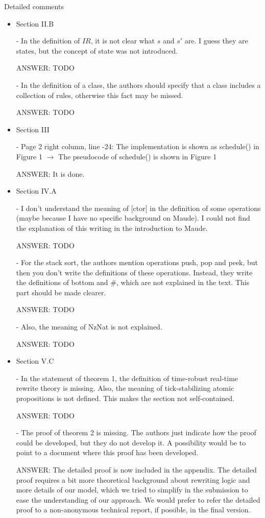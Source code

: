 \documentclass[10pt,journal]{IEEEtran}
\begin{document}
Detailed comments
\begin{itemize}
\item
Section II.B  

- In the definition of $IR$, it is not clear what $s$
and $s'$ are. I guess they are states, but the concept of state was
not introduced. 

ANSWER: TODO

- In the definition of a class, the authors should
specify that a class includes a collection of rules, otherwise this
fact may be missed.

ANSWER: TODO

\item
Section III 

- Page 2 right column, line -24: The implementation is shown as
schedule() in Figure 1 $\rightarrow$ The pseudocode of schedule() is
shown in Figure 1

ANSWER: It is done.

\item
Section IV.A 

- I don't understand the meaning of [ctor] in the definition of some
operations (maybe because I have no specific background on Maude). I
could not find the explanation of this writing in the introduction to
Maude.

ANSWER: TODO

- For the stack sort, the authors mention operations push, pop and
peek, but then you don't write the definitions of these
operations. Instead, they write the definitions of bottom and \#,
which are not explained in the text. This part should be made clearer.

ANSWER: TODO

- Also, the meaning of NzNat is not explained.

ANSWER: TODO

\item
Section V.C 

- In the statement of theorem 1, the definition of time-robust
real-time rewrite theory is missing. Also, the meaning of
tick-stabilizing atomic propositions is not defined. This makes the
section not self-contained.

ANSWER: TODO

- The proof of theorem 2 is missing. The authors just indicate how the
proof could be developed, but they do not develop it. A possibility
would be to point to a document where this proof has been developed.

ANSWER: The detailed proof is now included in the appendix.  The
detailed proof requires a bit more theoretical background about
rewriting logic and more details of our model, which we tried to
simplify in the submission to ease the understanding of our
approach. We would prefer to refer the detailed proof to a
non-anonymous technical report, if possible, in the final version.
\end{itemize}
\end{document}
